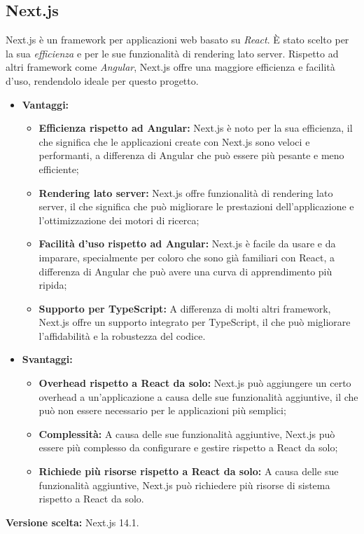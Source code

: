\documentclass[10pt, a4paper]{article}
\begin{document}
\subsection{Next.js}
Next.js è un framework per applicazioni web basato su \textit{React\pg}. È stato scelto per la sua \textit{efficienza\pg} e per le sue funzionalità di rendering lato server. Rispetto ad altri framework come \textit{Angular\pg}, Next.js offre una maggiore efficienza e facilità d'uso, rendendolo ideale per questo progetto.

\begin{itemize}
\item \textbf{Vantaggi:}
\begin{itemize}
\item \textbf{Efficienza rispetto ad Angular:} Next.js è noto per la sua efficienza, il che significa che le applicazioni create con Next.js sono veloci e performanti, a differenza di Angular che può essere più pesante e meno efficiente;
\item \textbf{Rendering lato server:} Next.js offre funzionalità di rendering lato server, il che significa che può migliorare le prestazioni dell'applicazione e l'ottimizzazione dei motori di ricerca;
\item \textbf{Facilità d'uso rispetto ad Angular:} Next.js è facile da usare e da imparare, specialmente per coloro che sono già familiari con React, a differenza di Angular che può avere una curva di apprendimento più ripida;
\item \textbf{Supporto per TypeScript:} A differenza di molti altri framework, Next.js offre un supporto integrato per TypeScript, il che può migliorare l'affidabilità e la robustezza del codice.
\end{itemize}
\item \textbf{Svantaggi:}
\begin{itemize}
\item \textbf{Overhead rispetto a React da solo:} Next.js può aggiungere un certo overhead a un'applicazione a causa delle sue funzionalità aggiuntive, il che può non essere necessario per le applicazioni più semplici;
\item \textbf{Complessità:} A causa delle sue funzionalità aggiuntive, Next.js può essere più complesso da configurare e gestire rispetto a React da solo;
\item \textbf{Richiede più risorse rispetto a React da solo:} A causa delle sue funzionalità aggiuntive, Next.js può richiedere più risorse di sistema rispetto a React da solo.
\end{itemize}
\end{itemize}
\textbf{Versione scelta:} Next.js 14.1.
\end{document}
